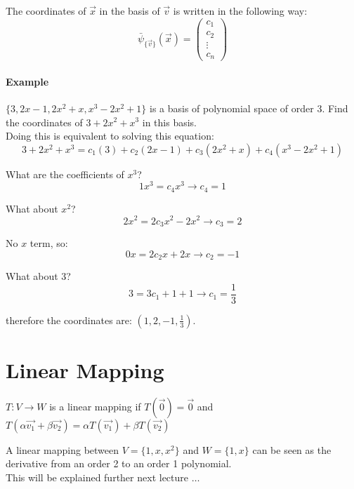 \documentclass{article}
\begin{document}
The coordinates of $\vec{x}$ in the basis of $\vec{v}$ is written in the following way:
$$
\bar{\psi}_{\{\vec{v}\}}(\vec{x}) = \begin{pmatrix}
    c_1 \\
    c_2 \\
    \vdots \\
    c_n
\end{pmatrix}
$$

\paragraph{Example} $\{3, 2x-1, 2x^2 + x, x^3 - 2x^2 + 1\}$ is a basis of polynomial space of order 3. Find the coordinates of $3 + 2x^2 + x^3$ in this basis. \\

Doing this is equivalent to solving this equation:
$$
3 + 2x^2 + x^3 = c_1(3) + c_2(2x-1) + c_3(2x^2 + x) + c_4(x^3 - 2x^2 + 1)
$$

What are the coefficients of $x^3$?
$$
1x^3 = c_4 x^3 \to c_4 = 1
$$

What about $x^2$?
$$
2x^2 = 2 c_3 x^2 - 2 x^2 \to c_3 = 2
$$

No $x$ term, so:
$$
0x = 2 c_2 x + 2x \to c_2 = -1
$$

What about 3?
$$
3 = 3 c_1 + 1 + 1 \to c_1 = \frac{1}{3}
$$

therefore the coordinates are: $(1, 2, -1, \frac{1}{3})$.

\section{Linear Mapping}
$T: V \to W$ is a linear mapping if $T(\vec{0}) = \vec{0}$ and $T(\alpha \vec{v_1} + \beta \vec{v_2}) = \alpha T(\vec{v_1}) + \beta T(\vec{v_2})$

A linear mapping between $V = \{1, x, x^2\}$ and $W = \{1, x\}$ can be seen as the derivative from an order 2 to an order 1 polynomial. \\

This will be explained further next lecture $\ldots$
\end{document}
